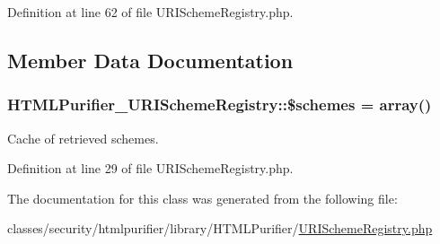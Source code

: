 Definition at line 62 of file U\+R\+I\+Scheme\+Registry.\+php.



\subsection{Member Data Documentation}
\hypertarget{classHTMLPurifier__URISchemeRegistry_a09ca1389f3c5d6912b41a9b55b249a40}{
\subsubsection[{\$schemes}]{\setlength{\rightskip}{0pt plus 5cm}H\+T\+M\+L\+Purifier\+\_\+\+U\+R\+I\+Scheme\+Registry\+::\$schemes = array()\hspace{0.3cm}{\ttfamily [protected]}}}\label{classHTMLPurifier__URISchemeRegistry_a09ca1389f3c5d6912b41a9b55b249a40}
Cache of retrieved schemes. 

Definition at line 29 of file U\+R\+I\+Scheme\+Registry.\+php.



The documentation for this class was generated from the following file\+:\begin{DoxyCompactItemize}
\item 
classes/security/htmlpurifier/library/\+H\+T\+M\+L\+Purifier/\hyperlink{URISchemeRegistry_8php}{U\+R\+I\+Scheme\+Registry.\+php}\end{DoxyCompactItemize}

